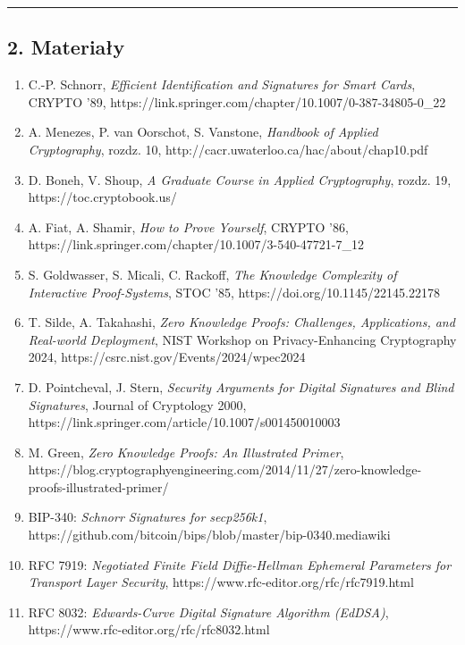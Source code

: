 \documentclass[
]{article}
\providecommand{\tightlist}{%
  \setlength{\itemsep}{0pt}\setlength{\parskip}{0pt}}
\let\oldrule\rule
\renewcommand{\rule}[2]{\noindent\oldrule{\linewidth}{0.4pt}}
\begin{document}
\begin{center}\rule{0.5\linewidth}{0.5pt}\end{center}

\subsection{2. Materiały}\label{materiaux142y}

\begin{enumerate}
\def\labelenumi{\arabic{enumi}.}
\tightlist
\item
  C.-P. Schnorr, \emph{Efficient Identification and Signatures for Smart
  Cards}, CRYPTO '89,
  https://link.springer.com/chapter/10.1007/0-387-34805-0\_22
\item
  A. Menezes, P. van Oorschot, S. Vanstone, \emph{Handbook of Applied
  Cryptography}, rozdz. 10,
  http://cacr.uwaterloo.ca/hac/about/chap10.pdf
\item
  D. Boneh, V. Shoup, \emph{A Graduate Course in Applied Cryptography},
  rozdz. 19, https://toc.cryptobook.us/
\item
  A. Fiat, A. Shamir, \emph{How to Prove Yourself}, CRYPTO '86,
  https://link.springer.com/chapter/10.1007/3-540-47721-7\_12
\item
  S. Goldwasser, S. Micali, C. Rackoff, \emph{The Knowledge Complexity
  of Interactive Proof-Systems}, STOC '85,
  https://doi.org/10.1145/22145.22178
\item
  T. Silde, A. Takahashi, \emph{Zero Knowledge Proofs: Challenges,
  Applications, and Real-world Deployment}, NIST Workshop on
  Privacy-Enhancing Cryptography 2024,
  https://csrc.nist.gov/Events/2024/wpec2024
\item
  D. Pointcheval, J. Stern, \emph{Security Arguments for Digital
  Signatures and Blind Signatures}, Journal of Cryptology 2000,
  https://link.springer.com/article/10.1007/s001450010003
\item
  M. Green, \emph{Zero Knowledge Proofs: An Illustrated Primer},
  https://blog.cryptographyengineering.com/2014/11/27/zero-knowledge-proofs-illustrated-primer/
\item
  BIP-340: \emph{Schnorr Signatures for secp256k1},
  https://github.com/bitcoin/bips/blob/master/bip-0340.mediawiki
\item
  RFC 7919: \emph{Negotiated Finite Field Diffie-Hellman Ephemeral
  Parameters for Transport Layer Security},
  https://www.rfc-editor.org/rfc/rfc7919.html
\item
  RFC 8032: \emph{Edwards-Curve Digital Signature Algorithm (EdDSA)},
  https://www.rfc-editor.org/rfc/rfc8032.html
\end{enumerate}
\end{document}
